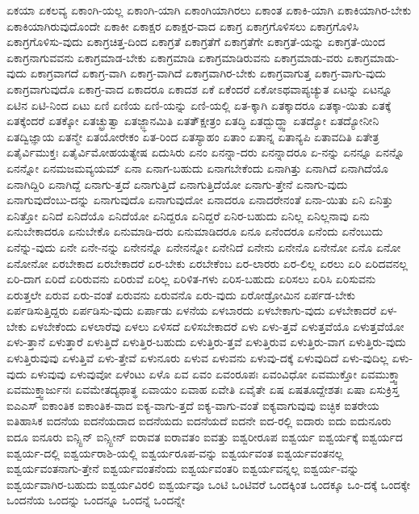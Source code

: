 {ಏಕಯಾ
ಏಕಲವ್ಯ
ಏಕಾಂಗಿ-ಯಲ್ಲ
ಏಕಾಂಗಿ-ಯಾಗಿ
ಏಕಾಂಗಿಯಾಗಿರಲು
ಏಕಾಂತ
ಏಕಾಕಿ-ಯಾಗಿ
ಏಕಾಕಿಯಾಗಿರ-ಬೇಕು
ಏಕಾಕಿಯಾಗಿರುವುದೊಂದೇ
ಏಕಾಕೀ
ಏಕಾಕ್ಷರ
ಏಕಾಕ್ಷರ-ವಾದ
ಏಕಾಗ್ರ
ಏಕಾಗ್ರಗೊಳಿಸಲು
ಏಕಾಗ್ರಗೊಳಿಸಿ
ಏಕಾಗ್ರಗೊಳಿಸು-ವುದು
ಏಕಾಗ್ರಚಿತ್ತ-ದಿಂದ
ಏಕಾಗ್ರತೆ
ಏಕಾಗ್ರತೆಗೆ
ಏಕಾಗ್ರತೆಗೇ
ಏಕಾಗ್ರತೆ-ಯನ್ನು
ಏಕಾಗ್ರತೆ-ಯಿಂದ
ಏಕಾಗ್ರನಾಗುವವನು
ಏಕಾಗ್ರಮಾಡ-ಬೇಕು
ಏಕಾಗ್ರಮಾಡಿ
ಏಕಾಗ್ರಮಾಡಿರುವನು
ಏಕಾಗ್ರಮಾಡು-ವರು
ಏಕಾಗ್ರಮಾಡು-ವುದು
ಏಕಾಗ್ರವಾಗದೆ
ಏಕಾಗ್ರ-ವಾಗಿ
ಏಕಾಗ್ರ-ವಾಗಿದೆ
ಏಕಾಗ್ರವಾಗಿರ-ಬೇಕು
ಏಕಾಗ್ರವಾಗುತ್ತ
ಏಕಾಗ್ರ-ವಾಗು-ವುದು
ಏಕಾಗ್ರವಾಗುವುದೊ
ಏಕಾಗ್ರ-ವಾದ
ಏಕಾದರೂ
ಏಕಾದಶ
ಏಕೆ
ಏಕೆಂದರೆ
ಏಕೋಽಥವಾಪ್ಯಚ್ಯುತ
ಏಟನ್ನು
ಏಟನ್ನೂ
ಏಟಿನ
ಏಟಿ-ನಿಂದ
ಏಟು
ಏಣಿ
ಏಣಿಯ
ಏಣಿ-ಯನ್ನು
ಏಣಿ-ಯಲ್ಲಿ
ಏತ-ಕ್ಕಾಗಿ
ಏತಕ್ಕಾದರೂ
ಏತಕ್ಕಾ-ಯಿತು
ಏತಕ್ಕೆ
ಏತಕ್ಕೆಂದರೆ
ಏತಕ್ಕೋ
ಏತಚ್ಛ್ರುತ್ವಾ
ಏತಜ್ಜ್ಞಾನಮಿತಿ
ಏತತ್ಕ್ಷೇತ್ರಂ
ಏತದ್ಧಿ
ಏತದ್ಬುದ್ಧ್ವಾ
ಏತದ್ಯೋ
ಏತದ್ಯೋನೀನಿ
ಏತದ್ವಿಜ್ಞಾಯ
ಏತನ್ಮೇ
ಏತಯೋರೇಕಂ
ಏತ-ರಿಂದ
ಏತಸ್ಯಾಹಂ
ಏತಾಂ
ಏತಾನ್ನ
ಏತಾನ್ಯಪಿ
ಏತಾವದಿತಿ
ಏತೇತ್ರ
ಏತೈರ್ವಿಮುಕ್ತಃ
ಏತೈರ್ವಿಮೋಹಯತ್ಯೇಷ
ಏದುಸಿರು
ಏನಂ
ಏನನ್ನಾ-ದರು
ಏನನ್ನಾದರೂ
ಏ-ನನ್ನು
ಏನನ್ನೂ
ಏನನ್ನೊ
ಏನನ್ನೋ
ಏನಮಜಮವ್ಯಯಮ್
ಏನಾ
ಏನಾಗ-ಬಹುದು
ಏನಾಗಬೇಕೆಂದು
ಏನಾಗಿತ್ತು
ಏನಾಗಿದೆ
ಏನಾಗಿದೆಯೊ
ಏನಾಗಿದ್ದಿರಿ
ಏನಾಗಿದ್ದೆ
ಏನಾಗು-ತ್ತದೆ
ಏನಾಗುತ್ತಿದೆ
ಏನಾಗುತ್ತಿದೆಯೋ
ಏನಾಗು-ತ್ತೇನೆ
ಏನಾಗು-ವುದು
ಏನಾಗುವುದೆಂಬು-ದನ್ನು
ಏನಾಗುವುದೊ
ಏನಾಗುವುದೋ
ಏನಾದರೂ
ಏನಾದರೇನಂತೆ
ಏನಾ-ಯಿತು
ಏನಿ
ಏನಿತ್ತು
ಏನಿತ್ತೋ
ಏನಿದೆ
ಏನಿದೆಯೊ
ಏನಿದೆಯೋ
ಏನಿದ್ದರೂ
ಏನಿದ್ದರೆ
ಏನಿರ-ಬಹುದು
ಏನಿಲ್ಲ
ಏನಿಲ್ಲನಾವು
ಏನು
ಏನುಬೇಕಾದರೂ
ಏನುಬೇಕೊ
ಏನುಮಾಡಿ-ದರು
ಏನುಮಾಡಿದರೂ
ಏನೂ
ಏನೆಂದರೂ
ಏನೆಂದು
ಏನೆಂಬುದು
ಏನೆನ್ನು-ವುದು
ಏನೇ
ಏನೇ-ನನ್ನು
ಏನೇನನ್ನೊ
ಏನೇನನ್ನೋ
ಏನೇನಿದೆ
ಏನೇನು
ಏನೇನೊ
ಏನೇನೋ
ಏನೊ
ಏನೋ
ಏನೋನೋ
ಏರಬೇಕಾದ
ಏರಬೇಕಾದರೆ
ಏರ-ಬೇಕು
ಏರಬೇಕೆಂಬ
ಏರ-ಲಾರರು
ಏರ-ಲಿಲ್ಲ
ಏರಲು
ಏರಿ
ಏರಿದವನಲ್ಲ
ಏರಿ-ದಾಗ
ಏರಿದೆ
ಏರಿರುವನು
ಏರಿರುವೆ
ಏರಿಲ್ಲ
ಏರಿಳಿತ-ಗಳು
ಏರಿಸ-ಬಹುದು
ಏರಿಸಲು
ಏರಿಸಿ
ಏರಿಸುವನು
ಏರುತ್ತಲೇ
ಏರುವ
ಏರು-ವಂತೆ
ಏರುವನು
ಏರುವನೊ
ಏರು-ವುದು
ಏರೋಡ್ರೋಮಿನ
ಏರ್ಪಡ-ಬೇಕು
ಏರ್ಪಡಿಸುತ್ತಿದ್ದರು
ಏರ್ಪಡಿಸು-ವುದು
ಏರ್ಪಾಡು
ಏಳನೆಯ
ಏಳಬಾರದು
ಏಳಬೇಕಾಗು-ವುದು
ಏಳಬೇಕಾದರೆ
ಏಳ-ಬೇಕು
ಏಳಬೇಕೆಂದು
ಏಳಲಾರೆವು
ಏಳಲು
ಏಳಿಸದೆ
ಏಳಿಸಬೇಕಾದರೆ
ಏಳು
ಏಳು-ತ್ತವೆ
ಏಳುತ್ತವೆಯೊ
ಏಳುತ್ತವೆಯೋ
ಏಳು-ತ್ತಾನೆ
ಏಳುತ್ತಾರೆ
ಏಳುತ್ತಿದೆ
ಏಳುತ್ತಿರ-ಬಹುದು
ಏಳುತ್ತಿರು-ತ್ತವೆ
ಏಳುತ್ತಿರುವ
ಏಳುತ್ತಿರು-ವಾಗ
ಏಳುತ್ತಿರು-ವುದು
ಏಳುತ್ತಿರುವುವು
ಏಳುತ್ತಿವೆ
ಏಳು-ತ್ತೇವೆ
ಏಳುನೂರು
ಏಳುವ
ಏಳುವನು
ಏಳುವು-ದಕ್ಕೆ
ಏಳುವುದಿದೆ
ಏಳು-ವುದಿಲ್ಲ
ಏಳು-ವುದು
ಏಳುವುವು
ಏಳುವುವೋ
ಏಳೆಂಟು
ಏಳೊ
ಏವ
ಏವಂ
ಏವಂರೂಪಃ
ಏವಂವಿಧೋ
ಏವಮುಕ್ತೋ
ಏವಮುಕ್ತ್ವಾ
ಏವಮುಕ್ತ್ವಾರ್ಜುನಃ
ಏವಮೇತದ್ಯಥಾತ್ಥ
ಏವಾಯಂ
ಏವಾಹ
ಏವೇತಿ
ಏವೈತೇ
ಏಷ
ಏಷತೂದ್ದೇಶತಃ
ಏಷಾ
ಏಸುಕ್ರಿಸ್ತ
ಐಎಎಸ್
ಐಕಾಂತಿಕ
ಐಕಾಂತಿಕ-ವಾದ
ಐಕ್ಯ-ವಾಗು-ತ್ತದೆ
ಐಕ್ಯ-ವಾಗು-ವಂತೆ
ಐಕ್ಯವಾಗುವುವು
ಐಚ್ಛಿಕ
ಐತರೇಯ
ಐತಿಹಾಸಿಕ
ಐದನೆಯ
ಐದನೆಯದಾದ
ಐದನೆಯದು
ಐದನೆಯದೆ
ಐದನೇ
ಐದ-ರಲ್ಲಿ
ಐದಾರು
ಐದು
ಐದುನೂರು
ಐದೂ
ಐನೂರು
ಐನ್ಸ್ಟಿನ್
ಐನ್ಸ್ಟೀನ್
ಐರಾವತ
ಐರಾವತಂ
ಐವತ್ತು
ಐಶ್ವರೀರೂಪ
ಐಶ್ವರ್ಯ
ಐಶ್ವರ್ಯಕ್ಕೆ
ಐಶ್ವರ್ಯದ
ಐಶ್ವರ್ಯ-ದಲ್ಲಿ
ಐಶ್ವರ್ಯರಾಶಿ-ಯಲ್ಲಿ
ಐಶ್ವರ್ಯರೂಪ-ವನ್ನು
ಐಶ್ವರ್ಯವಂತ
ಐಶ್ವರ್ಯವಂತನಲ್ಲ
ಐಶ್ವರ್ಯವಂತನಾಗು-ತ್ತೇನೆ
ಐಶ್ವರ್ಯವಂತನೆಂದು
ಐಶ್ವರ್ಯವಂತರಿ
ಐಶ್ವರ್ಯವನ್ನಲ್ಲ
ಐಶ್ವರ್ಯ-ವನ್ನು
ಐಶ್ವರ್ಯವಾಗಿರ-ಬಹುದು
ಐಶ್ವರ್ಯವಿರಲಿ
ಐಶ್ವರ್ಯವೂ
ಒಂಟಿ
ಒಂಟಿವರೆ
ಒಂದಕ್ಕಿಂತ
ಒಂದಕ್ಕೂ
ಒಂ-ದಕ್ಕೆ
ಒಂದಕ್ಕೇ
ಒಂದನೆಯ
ಒಂದನ್ನು
ಒಂದನ್ನೂ
ಒಂದನ್ನೆ
ಒಂದನ್ನೇ
}
